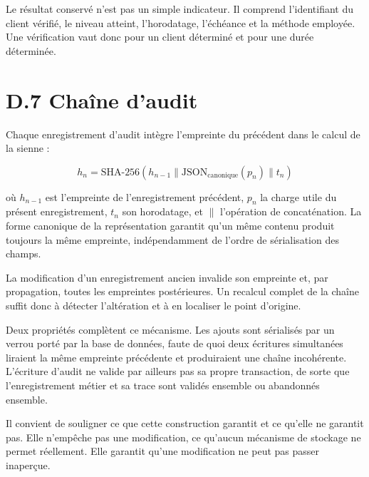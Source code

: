 Le résultat conservé n'est pas un simple indicateur. Il comprend l'identifiant du client vérifié, le niveau atteint, l'horodatage, l'échéance et la méthode employée. Une vérification vaut donc pour un client déterminé et pour une durée déterminée.

\section*{D.7 Chaîne d'audit}

Chaque enregistrement d'audit intègre l'empreinte du précédent dans le calcul de la sienne :

\begin{equation}
h_n = \mathrm{SHA\text{-}256}\left(h_{n-1} \parallel \mathrm{JSON}_{\mathrm{canonique}}(p_n) \parallel t_n\right)
\end{equation}

où $h_{n-1}$ est l'empreinte de l'enregistrement précédent, $p_n$ la charge utile du présent enregistrement, $t_n$ son horodatage, et $\parallel$ l'opération de concaténation. La forme canonique de la représentation garantit qu'un même contenu produit toujours la même empreinte, indépendamment de l'ordre de sérialisation des champs.

La modification d'un enregistrement ancien invalide son empreinte et, par propagation, toutes les empreintes postérieures. Un recalcul complet de la chaîne suffit donc à détecter l'altération et à en localiser le point d'origine.

Deux propriétés complètent ce mécanisme. Les ajouts sont sérialisés par un verrou porté par la base de données, faute de quoi deux écritures simultanées liraient la même empreinte précédente et produiraient une chaîne incohérente. L'écriture d'audit ne valide par ailleurs pas sa propre transaction, de sorte que l'enregistrement métier et sa trace sont validés ensemble ou abandonnés ensemble.

Il convient de souligner ce que cette construction garantit et ce qu'elle ne garantit pas. Elle n'empêche pas une modification, ce qu'aucun mécanisme de stockage ne permet réellement. Elle garantit qu'une modification ne peut pas passer inaperçue.
